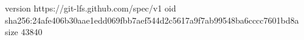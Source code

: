 version https://git-lfs.github.com/spec/v1
oid sha256:24afe406b30aae1edd069fbb7aef544d2c5617a9f7ab99548ba6cccc7601bd8a
size 43840
